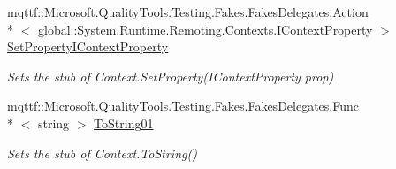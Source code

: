 \begin{DoxyCompactItemize}
mqttf\-::\-Microsoft.\-Quality\-Tools.\-Testing.\-Fakes.\-Fakes\-Delegates.\-Action\\*
$<$ global\-::\-System.\-Runtime.\-Remoting.\-Contexts.\-I\-Context\-Property $>$ \hyperlink{class_system_1_1_runtime_1_1_remoting_1_1_contexts_1_1_fakes_1_1_stub_context_ae6ffcad633a10fa61f96ae4c2e6c1aa9}{Set\-Property\-I\-Context\-Property}
\begin{DoxyCompactList}\small\item\em Sets the stub of Context.\-Set\-Property(\-I\-Context\-Property prop)\end{DoxyCompactList}\item 
mqttf\-::\-Microsoft.\-Quality\-Tools.\-Testing.\-Fakes.\-Fakes\-Delegates.\-Func\\*
$<$ string $>$ \hyperlink{class_system_1_1_runtime_1_1_remoting_1_1_contexts_1_1_fakes_1_1_stub_context_ab3ec54191b2211d997d7e57636bd24d4}{To\-String01}
\begin{DoxyCompactList}\small\item\em Sets the stub of Context.\-To\-String()\end{DoxyCompactList}\end{DoxyCompactItemize}
